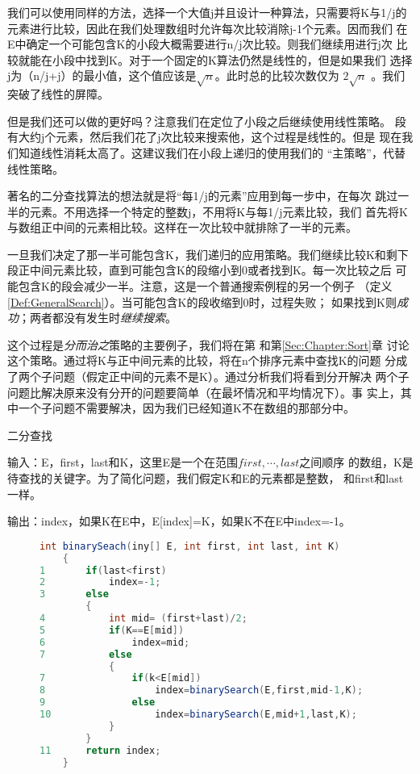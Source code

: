 我们可以使用同样的方法，选择一个大值j并且设计一种算法，只需要将K与1/j的
元素进行比较，因此在我们处理数组时允许每次比较消除j-1个元素。因而我们
在E中确定一个可能包含K的小段大概需要进行n/j次比较。则我们继续用进行j次
比较就能在小段中找到K。对于一个固定的K算法仍然是线性的，但是如果我们
选择j为（n/j+j）的最小值，这个值应该是$\sqrt{n}$。此时总的比较次数仅为
$2\sqrt{n}$ 。我们突破了线性的屏障。

但是我们还可以做的更好吗？注意我们在定位了小段之后继续使用线性策略。
段有大约j个元素，然后我们花了j次比较来搜索他，这个过程是线性的。但是
现在我们知道线性消耗太高了。这建议我们在小段上递归的使用我们的
“主策略”，代替线性策略。

著名的二分查找算法的想法就是将“每1/j的元素”应用到每一步中，在每次
跳过一半的元素。不用选择一个特定的整数j，不用将K与每1/j元素比较，我们
首先将K与数组正中间的元素相比较。这样在一次比较中就排除了一半的元素。

一旦我们决定了那一半可能包含K，我们递归的应用策略。我们继续比较K和剩下
段正中间元素比较，直到可能包含K的段缩小到0或者找到K。每一次比较之后
可能包含K的段会减少一半。注意，这是一个普通搜索例程的另一个例子
（定义\ref{Def:GeneralSearch}）。当可能包含K的段收缩到0时，过程失败；
如果找到K则\emph{成功}；两者都没有发生时\emph{继续搜索}。

这个过程是\emph{分而治之}策略的主要例子，我们将在第
\label{Sec:Chapter:RecursionAndInduction}和第\ref{Sec:Chapter:Sort}章
讨论这个策略。通过将K与正中间元素的比较，将在n个排序元素中查找K的问题
分成了两个子问题（假定正中间的元素不是K）。通过分析我们将看到分开解决
两个子问题比解决原来没有分开的问题要简单（在最坏情况和平均情况下）。事
实上，其中一个子问题不需要解决，因为我们已经知道K不在数组的那部分中。

\begin{algorithm}\label{Algo:BinrarySearch}
二分查找

输入：E，first，last和K，这里E是一个在范围$first,\cdots,last$之间顺序
的数组，K是待查找的关键字。为了简化问题，我们假定K和E的元素都是整数，
和first和last一样。

输出：index，如果K在E中，E[index]=K，如果K不在E中index=-1。
\begin{figure}
\begin{lstlisting}[language={Java}, keywordstyle=\color{blue!70}, commentstyle=\color{red!50!green!50!blue!50}]
    int binarySeach(iny[] E, int first, int last, int K)
    {
1       if(last<first)
2           index=-1;
3       else
        {
4           int mid= (first+last)/2;
5           if(K==E[mid])
6               index=mid;
7           else
            {
7               if(k<E[mid])
8                   index=binarySearch(E,first,mid-1,K);
9               else
10                  index=binarySearch(E,mid+1,last,K);
            }
        }
11      return index;
    }
\end{lstlisting}
\end{figure}

\end{algorithm}

